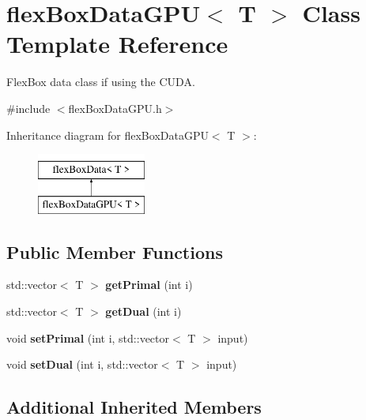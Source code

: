 \hypertarget{classflex_box_data_g_p_u}{}\section{flex\+Box\+Data\+G\+PU$<$ T $>$ Class Template Reference}
\label{classflex_box_data_g_p_u}


Flex\+Box data class if using the C\+U\+DA.  




{\ttfamily \#include $<$flex\+Box\+Data\+G\+P\+U.\+h$>$}

Inheritance diagram for flex\+Box\+Data\+G\+PU$<$ T $>$\+:\begin{figure}[H]
\begin{center}
\leavevmode
\includegraphics[height=2.000000cm]{classflex_box_data_g_p_u}
\end{center}
\end{figure}
\subsection*{Public Member Functions}
\begin{DoxyCompactItemize}
\item 
\mbox{\label{classflex_box_data_g_p_u_a9c165e562583eea70011d70b815e5cfe}} 
std\+::vector$<$ T $>$ {\bfseries get\+Primal} (int i)
\item 
\mbox{\label{classflex_box_data_g_p_u_a5f248d163e721a2a6f7cccea607a9f77}} 
std\+::vector$<$ T $>$ {\bfseries get\+Dual} (int i)
\item 
\mbox{\label{classflex_box_data_g_p_u_a6543fc24f5c5a26b4a86e088a9b01572}} 
void {\bfseries set\+Primal} (int i, std\+::vector$<$ T $>$ input)
\item 
\mbox{\label{classflex_box_data_g_p_u_a5a110d8ef2b8c4d348cb73755b777288}} 
void {\bfseries set\+Dual} (int i, std\+::vector$<$ T $>$ input)
\end{DoxyCompactItemize}
\subsection*{Additional Inherited Members}


